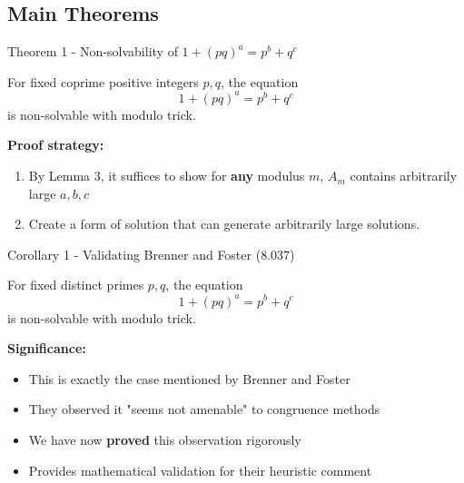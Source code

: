 \subsection{Main Theorems}

\begin{frame}{Theorem 1 - Non-solvability of $1+(pq)^a = p^b + q^c$}
    \begin{theorems}
        For fixed coprime positive integers $p,q$, the equation
        \[1+(pq)^a = p^b + q^c\]
        is non-solvable with modulo trick.
    \end{theorems}

    \textbf{Proof strategy:}
    \begin{enumerate}
        \item By Lemma 3, it suffices to show for \textbf{any} modulus $m$, $A_m$ 
        contains arbitrarily large $a,b,c$
        \item Create a form of solution that can generate arbitrarily large solutions.
    \end{enumerate}
  
\end{frame}

\begin{frame}{Corollary 1 - Validating Brenner and Foster (8.037)}
    \begin{corollarys}
        For fixed distinct primes $p,q$, the equation
        \[1+(pq)^a = p^b + q^c\]
        is non-solvable with modulo trick.
    \end{corollarys}
    
    \vspace{0.3cm}
    \textbf{Significance:}
    \begin{itemize}
        \item This is exactly the case mentioned by Brenner and Foster
        \item They observed it "seems not amenable" to congruence methods
        \item We have now \textbf{proved} this observation rigorously
        \item Provides mathematical validation for their heuristic comment
    \end{itemize}
\end{frame}

